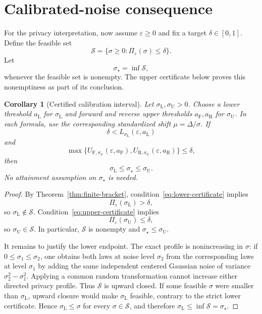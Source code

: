 \documentclass[11pt]{article}
\newtheorem{corollary}[theorem]{Corollary}
\theoremstyle{remark}
\begin{document}
\section{Calibrated-noise consequence}

For the privacy interpretation, now assume $\varepsilon\geq0$ and fix a target
$\delta\in[0,1]$.  Define the feasible set
\[
  \mathcal S
  =\{\sigma\geq0:\Pi_\varepsilon(\sigma)\leq\delta\}.
\]
Let
\[
  \sigma_\star=\inf\mathcal S,
\]
whenever the feasible set is nonempty.  The upper certificate below proves
this nonemptiness as part of its conclusion.

\begin{corollary}[Certified calibration interval]\label{cor:calibration}
Let $\sigma_{\mathrm L},\sigma_{\mathrm U}>0$.  Choose a lower threshold
$a_{\mathrm L}$ for $\sigma_{\mathrm L}$ and forward and reverse upper
thresholds $a_{\mathrm F},a_{\mathrm R}$ for $\sigma_{\mathrm U}$.  In each
formula, use the corresponding standardized shift $\mu=\Delta/\sigma$.
If
\begin{equation}\label{eq:lower-certificate}
  \delta<L_{\sigma_{\mathrm L}}(\varepsilon,a_{\mathrm L})
\end{equation}
and
\begin{equation}\label{eq:upper-certificate}
  \max\bigl\{
    U_{\mathrm F,\sigma_{\mathrm U}}(\varepsilon,a_{\mathrm F}),
    U_{\mathrm R,\sigma_{\mathrm U}}(\varepsilon,a_{\mathrm R})
  \bigr\}
  \leq\delta,
\end{equation}
then
\[
  \boxed{\sigma_{\mathrm L}\leq\sigma_\star\leq\sigma_{\mathrm U}.}
\]
No attainment assumption on $\sigma_\star$ is needed.
\end{corollary}

\begin{proof}
By Theorem~\ref{thm:finite-bracket}, condition~\eqref{eq:lower-certificate}
implies
\[
  \Pi_\varepsilon(\sigma_{\mathrm L})>\delta,
\]
so $\sigma_{\mathrm L}\notin\mathcal S$.  Condition~\eqref{eq:upper-certificate}
implies
\[
  \Pi_\varepsilon(\sigma_{\mathrm U})\leq\delta,
\]
so $\sigma_{\mathrm U}\in\mathcal S$.  In particular, $\mathcal S$ is
nonempty and $\sigma_\star\leq\sigma_{\mathrm U}$.

It remains to justify the lower endpoint.  The exact profile is nonincreasing
in $\sigma$: if $0\leq\sigma_1\leq\sigma_2$, one obtains both laws at noise
level $\sigma_2$ from the corresponding laws at level $\sigma_1$ by adding
the same independent centered Gaussian noise of variance
$\sigma_2^2-\sigma_1^2$.  Applying a common random transformation cannot
increase either directed privacy profile.  Thus $\mathcal S$ is upward
closed.  If some feasible $\sigma$ were smaller than
$\sigma_{\mathrm L}$, upward closure would make $\sigma_{\mathrm L}$ feasible,
contrary to the strict lower certificate.  Hence
$\sigma_{\mathrm L}\leq\sigma$ for every $\sigma\in\mathcal S$, and therefore
$\sigma_{\mathrm L}\leq\inf\mathcal S=\sigma_\star$.
\end{proof}
\end{document}
